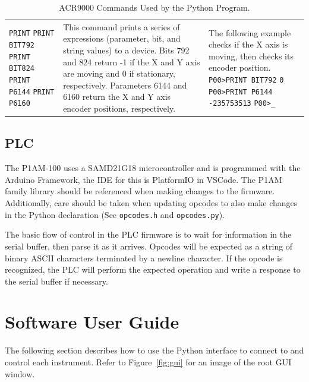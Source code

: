 \documentclass[titlepage]{article}
\begin{document}
\begin{table}[ht]
\begin{center}
\begin{tabularx}{\linewidth}{p{2cm}|>{\raggedright\arraybackslash}X|>{\raggedright\arraybackslash}X}
      \lstinline|PRINT| \newline
      \lstinline|PRINT BIT792| \newline
      \lstinline|PRINT BIT824| \newline
      \lstinline|PRINT P6144| \newline
      \lstinline|PRINT P6160|
      &
      This command prints a series of expressions (parameter, bit, and string values) to a device. Bits 792 and 824 return -1 if the X and Y axis are moving and 0 if stationary, respectively. Parameters 6144 and 6160 return the X and Y axis encoder positions, respectively. &
      The following example checks if the X axis is moving, then checks its encoder position. \newline
      \lstinline|P00>PRINT BIT792| \newline
      \lstinline|0| \newline
      \lstinline|P00>PRINT P6144| \newline
      \lstinline|-235753513| \newline
      \lstinline|P00>_|
    \end{tabularx}
  \end{center}
  \caption{ACR9000 Commands Used by the Python Program.}\label{tab:acrcommands}
\end{table}

\subsection{PLC}\label{sec:commsplc}
The P1AM-100 uses a SAMD21G18 microcontroller and is programmed with the Arduino Framework, the IDE for this is PlatformIO in VSCode. The P1AM family library should be referenced when making changes to the firmware. Additionally, care should be taken when updating opcodes to also make changes in the Python declaration (See \verb|opcodes.h| and \verb|opcodes.py|).

The basic flow of control in the PLC firmware is to wait for information in the serial buffer, then parse it as it arrives. Opcodes will be expected as a string of binary ASCII characters terminated by a newline character. If the opcode is recognized, the PLC will perform the expected operation and write a response to the serial buffer if necessary.

\section{Software User Guide}
The following section describes how to use the Python interface to connect to and control each instrument. Refer to Figure~\ref{fig:gui} for an image of the root GUI window.
\end{document}
